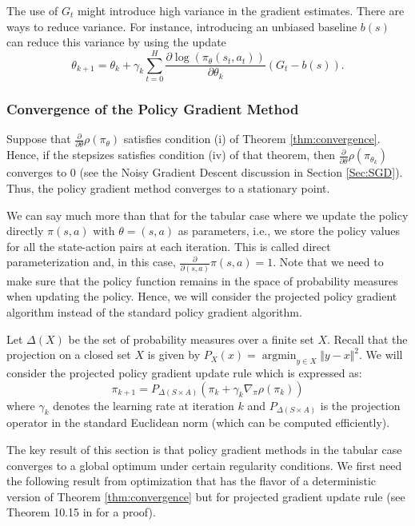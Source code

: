 \documentclass[letter,11pt]{article}
\begin{document}
The use of \( G_t \) might introduce high variance in the gradient estimates. There are ways to reduce variance. For instance, introducing an unbiased baseline $b(s)$ can  reduce this variance by using  the update 
\[
\theta_{k+1} = \theta_k + \gamma_k \sum_{t=0}^{H} \frac{\partial \log (\pi_\theta(s_t, a_t))}{\partial \theta_k} (G_t-b(s)).
\]

\subsubsection{Convergence of the Policy Gradient Method}
Suppose that  $\frac{\partial }{\partial \theta} \rho (\pi_{\theta} )$ satisfies condition (i) of Theorem \ref{thm:convergence}. Hence, if the stepsizes satisfies condition (iv) of that theorem, then $\frac{\partial }{\partial \theta} \rho (\pi_{\theta_{k}} )$  converges to $0$ (see the Noisy Gradient Descent discussion in Section \ref{Sec:SGD}). Thus, the policy gradient method converges to a stationary point. 

We can say much more than that for  the tabular case where we update the policy directly $\pi(s,a)$ with $\theta = (s,a)$ as parameters, i.e., we store the policy values for all the state-action pairs at each iteration. This is called direct parameterization and, in this case, $\frac{\partial }{\partial (s,a)} \pi(s,a) =1$. Note that we need to make sure that the policy function remains in the space of probability measures when updating the policy. Hence, we will consider the projected policy gradient algorithm instead of the standard policy gradient algorithm. 
  
  Let $\Delta(X)$ be the set of probability measures over a finite set $X$. Recall that the projection on a closed set $X$ is given by $P_{X}(x)=\operatorname{argmin}_{y \in X} \Vert y-x \Vert ^{2} $. We will consider 
  the projected policy gradient update rule which is expressed as:
\begin{equation} \label{Algo:projectedgradient}
\pi_{k+1} = P_{\Delta (S \times A) } ( \pi_k + \gamma_k \nabla_\pi \rho({\pi_k}) )
\end{equation}
where $\gamma_k$ denotes the learning rate at iteration $k$  and $P_{\Delta (S \times A) }$ is the projection operator in the standard Euclidean norm (which can be computed efficiently). 

The key result of this section is that policy gradient methods in the tabular case converges to a global optimum under certain regularity conditions.  We first need the following result from optimization that has the flavor of a deterministic version of Theorem \ref{thm:convergence} but for projected gradient update rule (see Theorem 10.15 in \cite{beck2017first} for a proof).  
\end{document}
